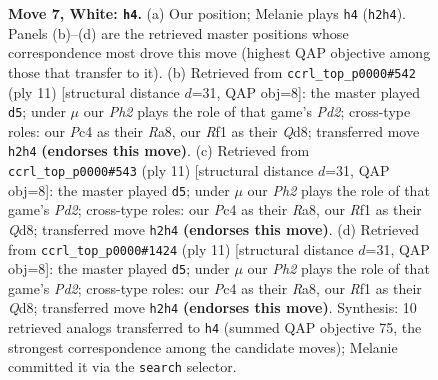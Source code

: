 \documentclass[11pt]{article}
\begin{document}
\begin{figure}[p]
\caption{\textbf{Move 7, White: \texttt{h4}.} (a) Our position; Melanie plays \texttt{h4} (\texttt{h2h4}). Panels (b)--(d) are the retrieved master positions whose correspondence most drove this move (highest QAP objective among those that transfer to it). (b) Retrieved from \texttt{ccrl\_top\_p0000\#542} (ply 11) [structural distance $d$=31, QAP obj=8]: the master played \texttt{d5}; under $\mu$ our \emph{Ph2} plays the role of that game's \emph{Pd2}; cross-type roles: our \emph{P}c4 as their \emph{R}a8, our \emph{R}f1 as their \emph{Q}d8; transferred move \texttt{h2h4} \textbf{(endorses this move)}. (c) Retrieved from \texttt{ccrl\_top\_p0000\#543} (ply 11) [structural distance $d$=31, QAP obj=8]: the master played \texttt{d5}; under $\mu$ our \emph{Ph2} plays the role of that game's \emph{Pd2}; cross-type roles: our \emph{P}c4 as their \emph{R}a8, our \emph{R}f1 as their \emph{Q}d8; transferred move \texttt{h2h4} \textbf{(endorses this move)}. (d) Retrieved from \texttt{ccrl\_top\_p0000\#1424} (ply 11) [structural distance $d$=31, QAP obj=8]: the master played \texttt{d5}; under $\mu$ our \emph{Ph2} plays the role of that game's \emph{Pd2}; cross-type roles: our \emph{P}c4 as their \emph{R}a8, our \emph{R}f1 as their \emph{Q}d8; transferred move \texttt{h2h4} \textbf{(endorses this move)}. Synthesis: 10 retrieved analogs transferred to \texttt{h4} (summed QAP objective 75, the strongest correspondence among the candidate moves); Melanie committed it via the \texttt{search} selector.}
\label{fig:thought-m12}
\end{figure}

\clearpage
\end{document}
